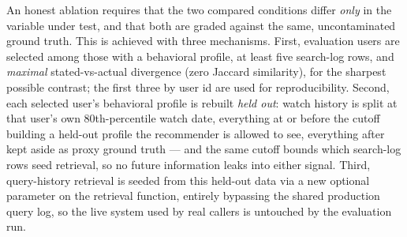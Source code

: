 \documentclass[11pt,a4paper,oneside]{book}
\begin{document}
An honest ablation requires that the two compared conditions differ \emph{only} in the variable
under test, and that both are graded against the same, uncontaminated ground truth. This is
achieved with three mechanisms. First, evaluation users are selected among those with a behavioral
profile, at least five search-log rows, and \emph{maximal} stated-vs-actual divergence (zero
Jaccard similarity), for the sharpest possible contrast; the first three by user id are used for
reproducibility. Second, each selected user's behavioral profile is rebuilt \emph{held out}: watch
history is split at that user's own 80th-percentile watch date, everything at or before the cutoff
building a held-out profile the recommender is allowed to see, everything after kept aside as proxy
ground truth --- and the same cutoff bounds which search-log rows seed retrieval, so no future
information leaks into either signal. Third, query-history retrieval is seeded from this held-out
data via a new optional parameter on the retrieval function, entirely bypassing the shared
production query log, so the live system used by real callers is untouched by the evaluation run.
\end{document}
